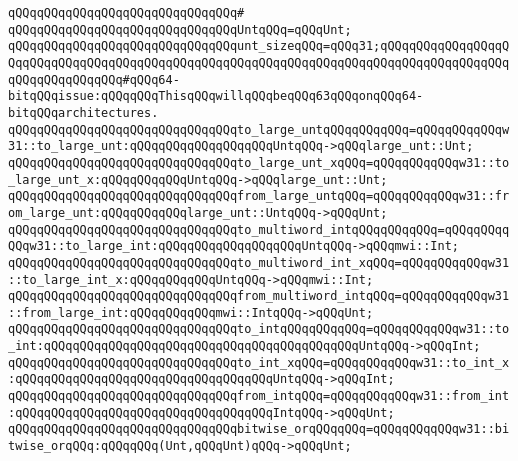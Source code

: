 \verb|qQQqqQQqqQQqqQQqqQQqqQQqqQQqqQQq#|\newline
\newline
\verb|qQQqqQQqqQQqqQQqqQQqqQQqqQQqqQQqUntqQQq=qQQqUnt;|\newline
\newline
\verb|qQQqqQQqqQQqqQQqqQQqqQQqqQQqqQQqunt_sizeqQQq=qQQq31;qQQqqQQqqQQqqQQqqQQqqQQqqQQqqQQqqQQqqQQqqQQqqQQqqQQqqQQqqQQqqQQqqQQqqQQqqQQqqQQqqQQqqQQqqQQqqQQqqQQqqQQq#qQQq64-bitqQQqissue:qQQqqQQqThisqQQqwillqQQqbeqQQq63qQQqonqQQq64-bitqQQqarchitectures.|\newline
\newline
\verb|qQQqqQQqqQQqqQQqqQQqqQQqqQQqqQQqto_large_untqQQqqQQqqQQq=qQQqqQQqqQQqw31::to_large_unt:qQQqqQQqqQQqqQQqqQQqUntqQQq->qQQqlarge_unt::Unt;|\newline
\verb|qQQqqQQqqQQqqQQqqQQqqQQqqQQqqQQqto_large_unt_xqQQq=qQQqqQQqqQQqw31::to_large_unt_x:qQQqqQQqqQQqUntqQQq->qQQqlarge_unt::Unt;|\newline
\verb|qQQqqQQqqQQqqQQqqQQqqQQqqQQqqQQqfrom_large_untqQQq=qQQqqQQqqQQqw31::from_large_unt:qQQqqQQqqQQqlarge_unt::UntqQQq->qQQqUnt;|\newline
\newline
\verb|qQQqqQQqqQQqqQQqqQQqqQQqqQQqqQQqto_multiword_intqQQqqQQqqQQq=qQQqqQQqqQQqw31::to_large_int:qQQqqQQqqQQqqQQqqQQqUntqQQq->qQQqmwi::Int;|\newline
\verb|qQQqqQQqqQQqqQQqqQQqqQQqqQQqqQQqto_multiword_int_xqQQq=qQQqqQQqqQQqw31::to_large_int_x:qQQqqQQqqQQqUntqQQq->qQQqmwi::Int;|\newline
\verb|qQQqqQQqqQQqqQQqqQQqqQQqqQQqqQQqfrom_multiword_intqQQq=qQQqqQQqqQQqw31::from_large_int:qQQqqQQqqQQqmwi::IntqQQq->qQQqUnt;|\newline
\newline
\verb|qQQqqQQqqQQqqQQqqQQqqQQqqQQqqQQqto_intqQQqqQQqqQQq=qQQqqQQqqQQqw31::to_int:qQQqqQQqqQQqqQQqqQQqqQQqqQQqqQQqqQQqqQQqqQQqUntqQQq->qQQqInt;|\newline
\verb|qQQqqQQqqQQqqQQqqQQqqQQqqQQqqQQqto_int_xqQQq=qQQqqQQqqQQqw31::to_int_x:qQQqqQQqqQQqqQQqqQQqqQQqqQQqqQQqqQQqUntqQQq->qQQqInt;|\newline
\verb|qQQqqQQqqQQqqQQqqQQqqQQqqQQqqQQqfrom_intqQQq=qQQqqQQqqQQqw31::from_int:qQQqqQQqqQQqqQQqqQQqqQQqqQQqqQQqqQQqIntqQQq->qQQqUnt;|\newline
\newline
\verb|qQQqqQQqqQQqqQQqqQQqqQQqqQQqqQQqbitwise_orqQQqqQQq=qQQqqQQqqQQqw31::bitwise_orqQQq:qQQqqQQq(Unt,qQQqUnt)qQQq->qQQqUnt;|\newline
